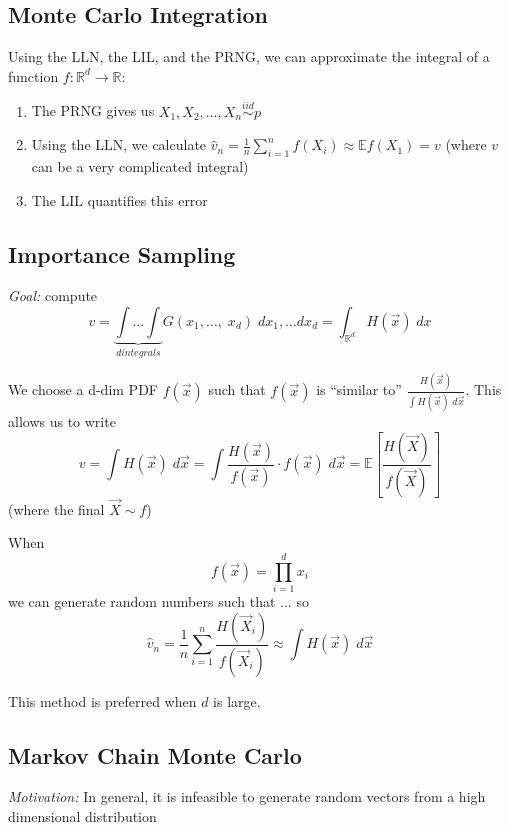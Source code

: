 \documentclass[12pt]{article}
\renewcommand{\hat}[1]{\widehat{#1}}
\newcommand{\R}{\mathbb{R}}
\newcommand{\E}{\mathbb{E}}
\newcommand{\iid}{\overset{iid}{\sim}}
\begin{document}
    \subsection{Monte Carlo Integration}
        Using the LLN, the LIL, and the PRNG, we can approximate the integral of a function $f: \R^d \to \R$:
        \begin{enumerate}
            \item The PRNG gives us $X_1, X_2, \dots, X_n \iid p$
            \item Using the LLN, we calculate $\hat v_n = \frac{1}{n} \sum_{i=1}^n f(X_i) \approx \E f(X_1) = v$ (where $v$ can be a very complicated integral)
            \item The LIL quantifies this error
        \end{enumerate}
        
    \subsection{Importance Sampling}
        \emph{Goal:} compute 
        \[v = \underbrace{\int \dots \int}_{d integrals} G(x_1, \dots,\; x_d) \; dx_1, \dots dx_d = \int_{\R^d} H(\vec x)\; dx\] 

        We choose a d-dim PDF $f(\vec x)$ such that $f(\vec x)$ is ``similar to'' $\frac{H(\vec x)}{\int H(\vec x)\; d\vec x}$. This allows us to write 
        \[v = \int H(\vec x) \;d \vec x = \int \frac{H(\vec x)}{f(\vec x)} \cdot f(\vec x)\; d\vec x = \E[\frac{H(\vec X)}{f(\vec X)}]\]
        (where the final $\vec X \sim f$)

        When 
        \[f(\vec x) = \prod_{i=1}^d x_i\]
        we can generate random numbers such that 
            ...
        so 
        \[\hat v_n = \frac{1}{n}\sum_{i=1}^n \frac{H(\vec X_i)}{f(\vec X_i)} \approx \int H(\vec x)\; d\vec x\] 

        This method is preferred when $d$ is large. 

    \subsection{Markov Chain Monte Carlo}
        \emph{Motivation:} In general, it is infeasible to generate random vectors from a high dimensional distribution 
\end{document}
